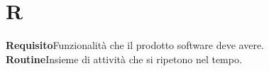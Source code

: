 \newpage
\section{R}\label{l:R}
\textbf{Requisito}\newline Funzionalità che il prodotto software deve avere.\\
\newline
\textbf{Routine}\newline Insieme di attività che si ripetono nel tempo.